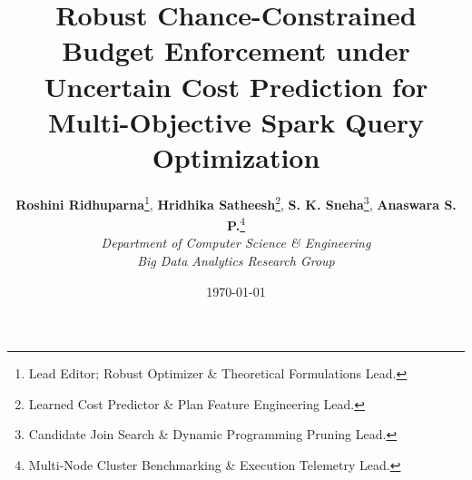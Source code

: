 \documentclass[journal,10pt,onecolumn]{article}
\begin{document}
\title{\textbf{Robust Chance-Constrained Budget Enforcement under Uncertain Cost Prediction for Multi-Objective Spark Query Optimization}}

\author{
  \textbf{Roshini Ridhuparna}\thanks{Lead Editor; Robust Optimizer \& Theoretical Formulations Lead.}, \quad
  \textbf{Hridhika Satheesh}\thanks{Learned Cost Predictor \& Plan Feature Engineering Lead.}, \quad
  \textbf{S. K. Sneha}\thanks{Candidate Join Search \& Dynamic Programming Pruning Lead.}, \quad
  \textbf{Anaswara S. P.}\thanks{Multi-Node Cluster Benchmarking \& Execution Telemetry Lead.} \\
  \textit{Department of Computer Science \& Engineering} \\
  \textit{Big Data Analytics Research Group}
}

\date{\today}
\maketitle
\end{document}
